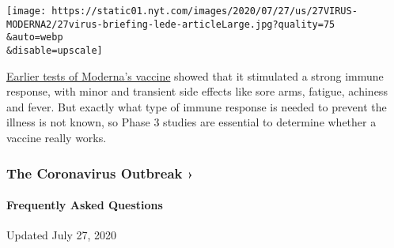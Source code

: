 \texttt{[image: https://static01.nyt.com/images/2020/07/27/us/27VIRUS-MODERNA2/27virus-briefing-lede-articleLarge.jpg?quality=75\\\&auto=webp\\\&disable=upscale]}

\href{https://www.nytimes.com/2020/07/14/health/cornavirus-vaccine-moderna.html?searchResultPosition=5}{Earlier
tests of Moderna's vaccine} showed that it stimulated a strong immune
response, with minor and transient side effects like sore arms, fatigue,
achiness and fever. But exactly what type of immune response is needed
to prevent the illness is not known, so Phase 3 studies are essential to
determine whether a vaccine really works.

\href{https://www.nytimes.com/news-event/coronavirus?action=click\&pgtype=Article\&state=default\&region=MAIN_CONTENT_3\&context=storylines_faq}{}

\hypertarget{the-coronavirus-outbreak-}{%
\subsubsection{The Coronavirus Outbreak
›}\label{the-coronavirus-outbreak-}}

\hypertarget{frequently-asked-questions}{%
\paragraph{Frequently Asked
Questions}\label{frequently-asked-questions}}

Updated July 27, 2020

